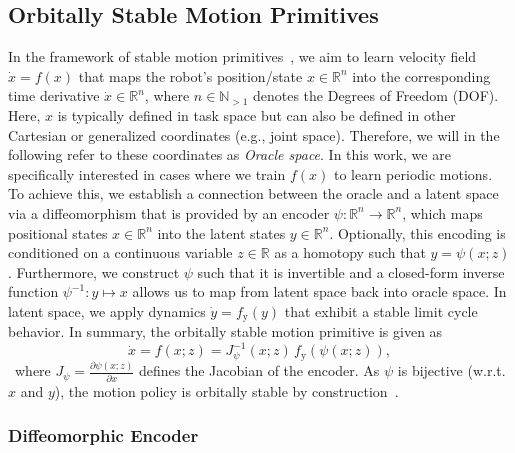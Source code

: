 \subsection{Orbitally Stable Motion Primitives}
In the framework of stable motion primitives~\citep{rana2020euclideanizing, perez2023stable, perez2024puma}, we aim to learn velocity field $\dot{x} = f(x)$ that maps the robot's position/state $x \in \mathbb{R}^n$ into the corresponding time derivative $\dot{x} \in \mathbb{R}^n$, where $n \in \mathbb{N}_{>1}$ denotes the Degrees of Freedom (DOF). Here, $x$ is typically defined in task space but can also be defined in other Cartesian or generalized coordinates (e.g., joint space). Therefore, we will in the following refer to these coordinates as \emph{Oracle space}.
In this work, we are specifically interested in cases where we train $f(x)$ to learn periodic motions.
To achieve this, we establish a connection between the oracle and a latent space via a diffeomorphism that is provided by an encoder $\psi: \mathbb{R}^n \to \mathbb{R}^n$, which maps positional states $x \in \mathbb{R}^n$ into the latent states $y \in \mathbb{R}^n$.
Optionally, this encoding is conditioned on a continuous variable $z \in \mathbb{R}$ as a homotopy such that $y = \psi(x;z)$.
Furthermore, we construct $\psi$ such that it is invertible and a closed-form inverse function $\psi^{-1}: y \mapsto x$ allows us to map from latent space back into oracle space.
In latent space, we apply dynamics $\dot{y} = f_\mathrm{y}(y)$ that exhibit a stable limit cycle behavior. In summary, the orbitally stable motion primitive is given as
\begin{equation}
    \dot{x} = f(x;z) = J_\psi^{-1}(x;z) \, f_\mathrm{y} \left (\psi(x;z) \right ),
\end{equation}\
where $J_\psi = \frac{\partial \psi(x;z)}{\partial x}$ defines the Jacobian of the encoder. 
As $\psi$ is bijective (w.r.t. $x$ and $y$), the motion policy is orbitally stable by construction~\citep{zhi2024teaching}.

\subsubsection{Diffeomorphic Encoder}

